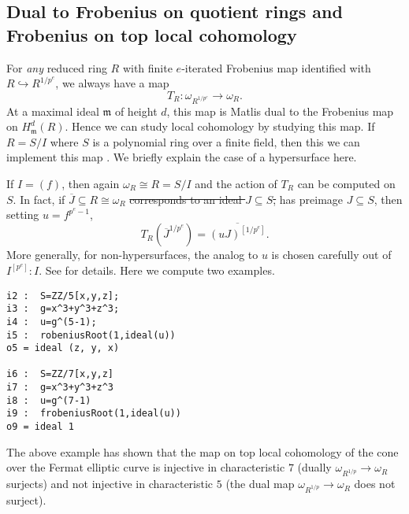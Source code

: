 \documentclass[11pt]{amsart}
\newcommand{\fram}{\mathfrak{m}}
\begin{document}
\subsection{Dual to Frobenius on quotient rings and Frobenius on top local cohomology}
\label{subsec.DualToFrobeniusOnQuotientRings}
For \emph{any} reduced ring $R$ with finite $e$-iterated Frobenius map identified with $R \hookrightarrow R^{1/p^e}$, we always have a map
\[
T_R : \omega_{R^{1/p^e}} \to \omega_R.
\]
At a maximal ideal $\fram$ of height $d$, this map is Matlis dual to the Frobenius map on $H^d_{\fram}(R)$.  Hence we can study local cohomology by studying this map.  If $R = S/I$ where $S$ is a polynomial ring over a finite field, then this we can implement this map \cite{FedderFPureRat, KatzmanParameterTestIdealOfCMRings}.  We briefly explain the case of a hypersurface here.

If $I = (f)$, then again $\omega_R \cong R = S/I$ and the action of $T_R$ can be computed on $S$.  In fact, if $\overline{J} \subseteq R \cong \omega_R$ 
\sout{corresponds to an ideal $J \subseteq S$,}
has preimage  $J \subseteq S$,
then setting $u = f^{p^e-1}$,
\[
T_R({\overline J}^{1/p^e}) = \overline{(u J)^{[1/p^e]}}.
\]
More generally, for non-hypersurfaces, the analog to $u$ is chosen carefully out of $I^{[p^e]} : I$.  See \cite{KatzmanParameterTestIdealOfCMRings} for details.  Here we compute two examples.

\begin{verbatim}
i2 :  S=ZZ/5[x,y,z];
i3 :  g=x^3+y^3+z^3;
i4 :  u=g^(5-1);
i5 :  robeniusRoot(1,ideal(u))
o5 = ideal (z, y, x)

i6 :  S=ZZ/7[x,y,z]
i7 :  g=x^3+y^3+z^3
i8 :  u=g^(7-1)
i9 :  frobeniusRoot(1,ideal(u))
o9 = ideal 1
\end{verbatim}

The above example has shown that the map on top local cohomology of the cone over the Fermat elliptic curve is injective in characteristic $7$ (dually $\omega_{R^{1/p}} \to \omega_R$ surjects) and not injective in characteristic $5$ (the dual map $\omega_{R^{1/p}} \to \omega_R$ does not surject).
\end{document}
